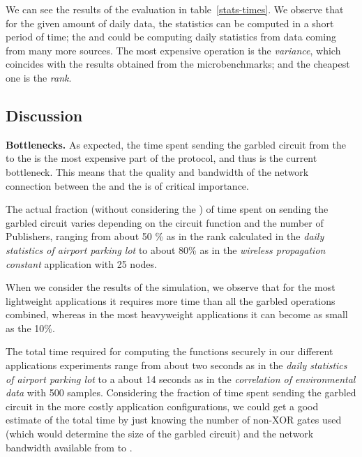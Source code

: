 We can see the results of the evaluation in table~\ref{stats-times}.  We
observe that for the given amount of daily data, the statistics can be computed
in a short period of time; the \broker and \garbler could be computing daily
statistics from data coming from many more sources.  The most expensive
operation is the \emph{variance}, which coincides with the results obtained
from the microbenchmarks; and the cheapest one is the \emph{rank}.




\vspace{-4pt}
\subsection{Discussion}

\noindent\textbf{Bottlenecks.}  As expected, the time spent sending the garbled
circuit from the \garbler to the \broker is the most expensive part of the
protocol, and thus is the current bottleneck.  This means that the quality and
bandwidth of the network connection between the \broker and the \garbler is of
critical importance.

The actual fraction (without considering the \PSI) of time spent on sending the
garbled circuit varies depending on the circuit function and the number of
Publishers, ranging from about 50 \% as in the rank calculated in the
\emph{daily statistics of airport parking lot} to about 80\% as in the
\emph{wireless propagation constant} application with 25 nodes.

When we consider the results of the \PSI simulation, we observe that for the
most lightweight applications it requires more time than all the garbled
operations combined, whereas in the most heavyweight applications it can become
as small as the 10\%.

The total time required for computing the functions securely in our different
applications experiments range from about two seconds as in the \emph{daily
statistics of airport parking lot} to a about 14 seconds as in the
\emph{correlation of environmental data} with 500 samples.  Considering the
fraction of time spent sending the garbled circuit in the more costly
application configurations, we could get a good estimate of the total time by
just knowing the number of non-XOR gates used (which would determine the size
of the garbled circuit) and the network bandwidth available from \broker to
\garbler.

